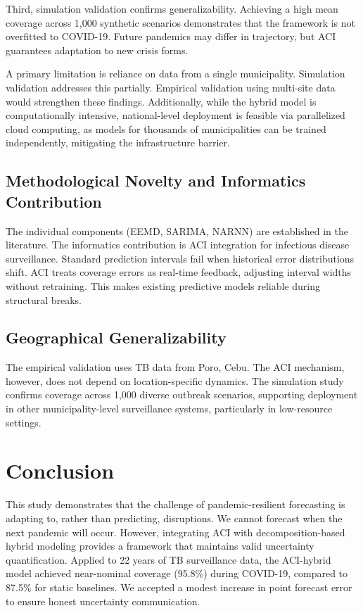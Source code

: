 \documentclass[final,3p,times,twocolumn,authoryear]{elsarticle}
\begin{document}
Third, simulation validation confirms generalizability. Achieving a high mean coverage across 1,000 synthetic scenarios demonstrates that the framework is not overfitted to COVID-19. Future pandemics may differ in trajectory, but ACI guarantees adaptation to new crisis forms.

A primary limitation is reliance on data from a single municipality. Simulation validation addresses this partially. Empirical validation using multi-site data would strengthen these findings. Additionally, while the hybrid model is computationally intensive, national-level deployment is feasible via parallelized cloud computing, as models for thousands of municipalities can be trained independently, mitigating the infrastructure barrier.

\subsection{Methodological Novelty and Informatics Contribution}
The individual components (EEMD, SARIMA, NARNN) are established in the literature. The informatics contribution is ACI integration for infectious disease surveillance. Standard prediction intervals fail when historical error distributions shift. ACI treats coverage errors as real-time feedback, adjusting interval widths without retraining. This makes existing predictive models reliable during structural breaks.

\subsection{Geographical Generalizability}
The empirical validation uses TB data from Poro, Cebu. The ACI mechanism, however, does not depend on location-specific dynamics. The simulation study confirms coverage across 1,000 diverse outbreak scenarios, supporting deployment in other municipality-level surveillance systems, particularly in low-resource settings.

\section{Conclusion}
\label{sec:conclusion}

This study demonstrates that the challenge of pandemic-resilient forecasting is adapting to, rather than predicting, disruptions. We cannot forecast when the next pandemic will occur. However, integrating ACI with decomposition-based hybrid modeling provides a framework that maintains valid uncertainty quantification. Applied to 22 years of TB surveillance data, the ACI-hybrid model achieved near-nominal coverage (95.8\%) during COVID-19, compared to 87.5\% for static baselines. We accepted a modest increase in point forecast error to ensure honest uncertainty communication.
\end{document}
